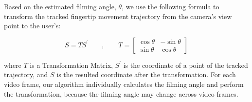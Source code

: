 Based on the estimated filming angle, $\theta$, we use the following formula to transform the tracked fingertip movement trajectory from the camera's view point to the user's:

\begin{equation}
        S=TS^{'} \qquad, \qquad  T=\left[ \begin{matrix} \cos\theta & -\sin\theta \\ \sin\theta & \cos\theta \end{matrix} \right]
\end{equation}

where $T$ is a Transformation Matrix, $S^{'}$ is the coordinate of a point of the tracked trajectory, and $S$ is the resulted coordinate after the transformation.
For each video frame, our algorithm individually calculates the filming angle and perform the transformation, because the filming angle may change across video frames.


